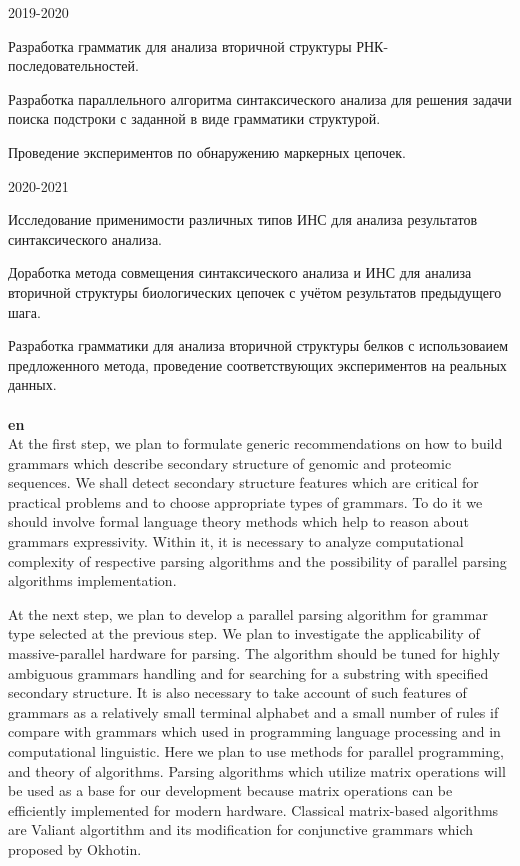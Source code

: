 \documentclass[12pt]{article}  %
\theoremstyle{remark}
\begin{document}
2019-2020

Разработка грамматик для анализа вторичной структуры РНК-последовательностей.

Разработка параллельного алгоритма синтаксического анализа для решения задачи поиска подстроки с заданной в виде грамматики структурой.

Проведение экспериментов по обнаружению маркерных цепочек.

2020-2021

Исследование применимости различных типов ИНС для анализа результатов синтаксического анализа.

Доработка метода совмещения синтаксического анализа и ИНС для анализа вторичной структуры биологических цепочек с учётом результатов предыдущего шага.

Разработка грамматики для анализа вторичной структуры белков с использоваием предложенного метода, проведение соответствующих экспериментов на реальных данных.
\\
\\
\textbf{en}\\
At the first step, we plan to formulate generic recommendations on how to build grammars which describe secondary structure of genomic and proteomic sequences.
We shall detect secondary structure features which are critical for practical problems and to choose appropriate types of grammars.
To do it we should involve formal language theory methods which help to reason about grammars expressivity.
Within it, it is necessary to analyze computational complexity of respective parsing algorithms and the possibility of parallel parsing algorithms implementation.

At the next step, we plan to develop a parallel parsing algorithm for grammar type selected at the previous step.
We plan to investigate the applicability of massive-parallel hardware for parsing.
The algorithm should be tuned for highly ambiguous grammars handling and for searching for a substring with specified secondary structure.
It is also necessary to take account of such features of grammars as a relatively small terminal alphabet and a small number of rules if compare with grammars which used in programming language processing and in computational linguistic.
Here we plan to use methods for parallel programming, and theory of algorithms.
Parsing algorithms which utilize matrix operations will be used as a base for our development because matrix operations can be efficiently implemented for modern hardware.
Classical matrix-based algorithms are Valiant algortithm and its modification for conjunctive grammars which proposed by Okhotin.
\end{document}
